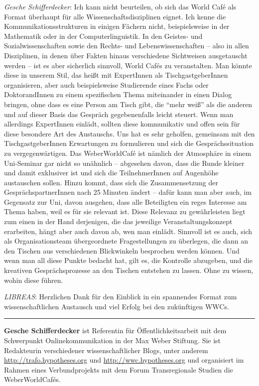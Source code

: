 \documentclass[a4paper,
fontsize=11pt,
oneside,
numbers=noperiodatend,
parskip=half-,
bibliography=totoc,
final
]{scrartcl}
\begin{document}
\emph{Gesche Schifferdecker}: Ich kann nicht beurteilen, ob sich das
World Café als Format überhaupt für alle Wissenschaftsdisziplinen
eignet. Ich kenne die Kommunikationsstrukturen in einigen Fächern nicht,
beispielsweise in der Mathematik oder in der Computerlinguistik. In den
Geistes- und Sozialwissenschaften sowie den Rechts- und
Lebenswissenschaften -- also in allen Disziplinen, in denen über Fakten
hinaus verschiedene Sichtweisen ausgetauscht werden -- ist es aber
sicherlich sinnvoll, World Cafés zu veranstalten. Man könnte diese in
unserem Stil, das heißt mit ExpertInnen als TischgastgeberInnen
organisieren, aber auch beispielsweise Studierende eines Fachs oder
DoktorandInnen zu einem spezifischen Thema miteinander in einen Dialog
bringen, ohne dass es eine Person am Tisch gibt, die \enquote{mehr weiß}
als die anderen und auf dieser Basis das Gespräch gegebenenfalls leicht
steuert. Wenn man allerdings ExpertInnen einlädt, sollten diese
kommunikativ und offen sein für diese besondere Art des Austauschs. Uns
hat es sehr geholfen, gemeinsam mit den TischgastgeberInnen Erwartungen
zu formulieren und sich die Gesprächssituation zu vergegenwärtigen. Das
WeberWorldCafé ist nämlich der Atmosphäre in einem Uni-Seminar gar nicht
so unähnlich -- abgesehen davon, dass die Runde kleiner und damit
exklusiver ist und sich die TeilnehmerInnen auf Augenhöhe austauschen
sollen. Hinzu kommt, dass sich die Zusammensetzung der
GesprächspartnerInnen nach 25 Minuten ändert -- dafür kann man aber
auch, im Gegensatz zur Uni, davon ausgehen, dass alle Beteiligten ein
reges Interesse am Thema haben, weil es für sie relevant ist. Diese
Relevanz zu gewährleisten liegt zum einen in der Hand derjenigen, die
das jeweilige Veranstaltungskonzept erarbeiten, hängt aber auch davon
ab, wen man einlädt. Sinnvoll ist es auch, sich als Organisationsteam
übergeordnete Fragestellungen zu überlegen, die dann an den Tischen aus
verschiedenen Blickwinkeln besprochen werden können. Und wenn man all
diese Punkte bedacht hat, gilt es, die Kontrolle abzugeben, und die
kreativen Gesprächsprozesse an den Tischen entstehen zu lassen. Ohne zu
wissen, wohin diese führen.

\emph{LIBREAS}: Herzlichen Dank für den Einblick in ein spannendes
Format zum wissenschaftlichen Austausch und viel Erfolg bei den
zukünftigen WWCs.

\begin{center}\rule{0.5\linewidth}{\linethickness}\end{center}

\textbf{Gesche Schifferdecker} ist Referentin für Öffentlichkeitsarbeit
mit dem Schwerpunkt Onlinekommunikation in der Max Weber Stiftung. Sie
ist Redakteurin verschiedener wissenschaftlicher Blogs, unter anderem
\url{http://trafo.hypotheses.org} und \url{http://wwc.hypotheses.org}
und organisiert im Rahmen eines Verbundprojekts mit dem Forum
Transregionale Studien die WeberWorldCafés.
\end{document}
